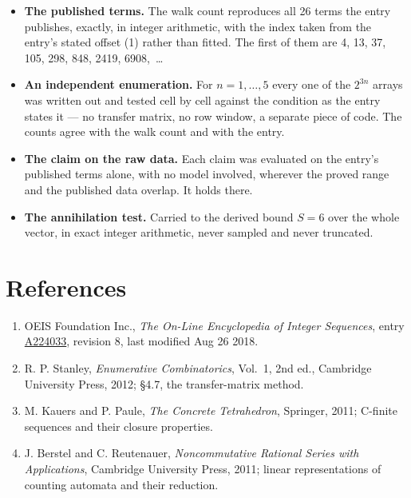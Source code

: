\documentclass[11pt]{article}
\theoremstyle{definition}
\begin{document}
\begin{itemize}

\item {\bfseries The published terms.} The walk count reproduces all 26 terms the entry publishes, exactly, in integer arithmetic, with the index taken from the entry's stated offset (1) rather than fitted. The first of them are 4, 13, 37, 105, 298, 848, 2419, 6908,~\dots

\item {\bfseries An independent enumeration.} For $n = 1,\dots,5$ every one of the $2^{3n}$ arrays was written out and tested cell by cell against the condition as the entry states it --- no transfer matrix, no row window, a separate piece of code. The counts agree with the walk count and with the entry.

\item {\bfseries The claim on the raw data.} Each claim was evaluated on the entry's published terms alone, with no model involved, wherever the proved range and the published data overlap. It holds there.

\item {\bfseries The annihilation test.} Carried to the derived bound $S = 6$ over the whole vector, in exact integer arithmetic, never sampled and never truncated.

\end{itemize}

\section{References}

\begin{enumerate}

\item OEIS Foundation Inc., \emph{The On-Line Encyclopedia of Integer Sequences}, entry \href{https://oeis.org/A224033}{A224033}, revision 8, last modified Aug 26 2018.

\item R. P. Stanley, \emph{Enumerative Combinatorics}, Vol.~1, 2nd ed., Cambridge University Press, 2012; \S4.7, the transfer-matrix method.

\item M. Kauers and P. Paule, \emph{The Concrete Tetrahedron}, Springer, 2011; C-finite sequences and their closure properties.

\item J. Berstel and C. Reutenauer, \emph{Noncommutative Rational Series with Applications}, Cambridge University Press, 2011; linear representations of counting automata and their reduction.

\end{enumerate}
\end{document}

